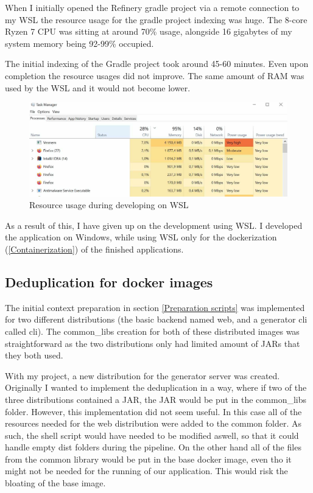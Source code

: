 		When I initially opened the Refinery gradle project via a remote connection to my WSL the resource usage 
		for the gradle project indexing was huge. The 8-core Ryzen 7 CPU was sitting at around 70\%  usage, alongside 
		16 gigabytes of my system memory being 92-99\% occupied. 
		
		The initial indexing of the Gradle project took around 45-60 minutes. Even upon completion the resource usages did not improve. 
		The same amount of RAM
		was used by the WSL and it would not become lower. 

		\begin{figure}[h!]
			\begin{center}
				\includegraphics[scale=0.35]{include/imgs/res_usage.jpg}
				\caption{Resource usage during developing on WSL}
				\label{resourceusagewsl}
			\end{center}
		\end{figure}

		As a result of this, I have given up on the development using WSL. I developed the application on Windows, while using WSL only for the
		dockerization (\ref{Containerization}) of the finished applications.

	\subsection{Deduplication for docker images}
		The initial context preparation in section \ref{Preparation scripts} was implemented for two different distributions (the basic backend 
		named web, and a generator cli called cli). The common\_libs creation for both of these distributed images was straightforward
		as the two distributions only had limited amount of JARs that they both used.

		With my project, a new distribution for the generator server was created. Originally I wanted to implement the deduplication in a way,
		where if two of the three distributions contained a JAR, the JAR would be put in the common\_libs folder.
		However, this implementation did not seem useful. In this case all of the resources needed for the web distribution were added to the common folder.
		As such, the shell script would have needed to be modified aswell, so that it could handle empty dist folders during the pipeline. 
		On the other hand
		all of the files from the common library would be put in the base docker image, even tho it might not be needed for the 
		running of our application. This would risk the bloating of the base image.

